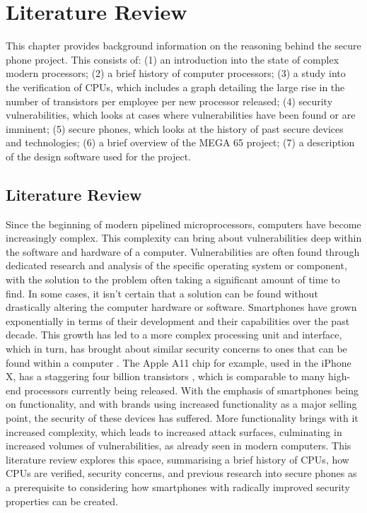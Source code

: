 
\chapter{Literature Review} %

\label{Chapter2} %

This chapter provides background information on the reasoning behind the secure phone project.
This consists of: (1) an introduction into the state of complex modern processors; (2) a brief history of computer processors; (3) a study into the verification of CPUs, which includes a graph detailing the large rise in the number of transistors per employee per new processor released; (4) security vulnerabilities, which looks at cases where vulnerabilities have been found or are imminent; (5) secure phones, which looks at the history of past secure devices and technologies; (6) a brief overview of the MEGA 65 project; (7) a description of the design software used for the project.\\


\section{Literature Review}

Since the beginning of modern pipelined microprocessors, computers have become increasingly complex.
This complexity can bring about vulnerabilities deep within the software and hardware of a computer.
Vulnerabilities are often found through dedicated research and analysis of the specific operating system or component, with the solution to the problem often taking a significant amount of time to find.
In some cases, it isn’t certain that a solution can be found without drastically altering the computer hardware or software. 
Smartphones have grown exponentially in terms of their development and their capabilities over the past decade.
This growth has led to a more complex processing unit and interface, which in turn, has brought about similar security concerns to ones that can be found within a computer \cite{RN27}.
The Apple A11 chip for example, used in the iPhone X, has a staggering four billion transistors \cite{RN28}, which is comparable to many high-end processors currently being released.
With the emphasis of smartphones being on functionality, and with brands using increased functionality as a major selling point, the security of these devices has suffered.
More functionality brings with it increased complexity, which leads to increased attack surfaces, culminating in increased volumes of vulnerabilities, as already seen in modern computers.
This literature review explores this space, summarising a brief history of CPUs, how CPUs are verified, security concerns, and previous research into secure phones as a prerequisite to considering how smartphones with radically improved security properties can be created.

